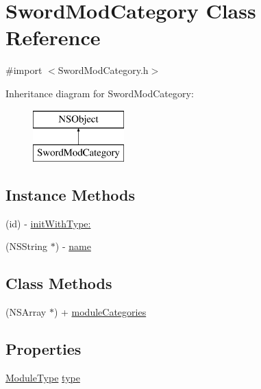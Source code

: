 \hypertarget{interface_sword_mod_category}{\section{Sword\-Mod\-Category Class Reference}
\label{interface_sword_mod_category}
}


{\ttfamily \#import $<$Sword\-Mod\-Category.\-h$>$}

Inheritance diagram for Sword\-Mod\-Category\-:\begin{figure}[H]
\begin{center}
\leavevmode
\includegraphics[height=2.000000cm]{interface_sword_mod_category}
\end{center}
\end{figure}
\subsection*{Instance Methods}
\begin{DoxyCompactItemize}
\item 
(id) -\/ \hyperlink{interface_sword_mod_category_a8bf913853dd66ef76bcce50be21ac3b2}{init\-With\-Type\-:}
\item 
(N\-S\-String $\ast$) -\/ \hyperlink{interface_sword_mod_category_ac6691947ac2050dd45d083b4b998dada}{name}
\end{DoxyCompactItemize}
\subsection*{Class Methods}
\begin{DoxyCompactItemize}
\item 
(N\-S\-Array $\ast$) + \hyperlink{interface_sword_mod_category_acf792e1baac863a5cbe85304ae67e445}{module\-Categories}
\end{DoxyCompactItemize}
\subsection*{Properties}
\begin{DoxyCompactItemize}
\item 
\hyperlink{_sword_module_8h_a224128d35337e2b42cebf846d4d0c6f1}{Module\-Type} \hyperlink{interface_sword_mod_category_a69cc06aed2c7e6cbe7b4c09b62e4a57d}{type}
\end{DoxyCompactItemize}


